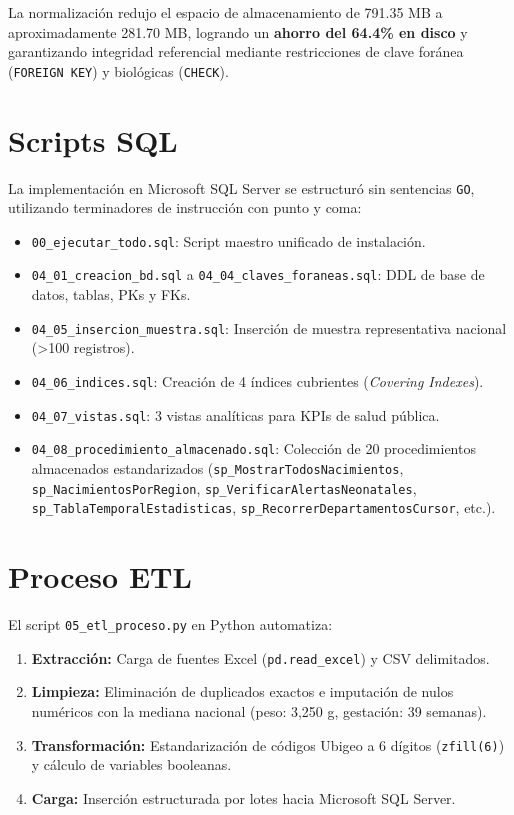 \documentclass[12pt,a4paper]{article}
\begin{document}
La normalización redujo el espacio de almacenamiento de 791.35 MB a aproximadamente 281.70 MB, logrando un \textbf{ahorro del 64.4\% en disco} y garantizando integridad referencial mediante restricciones de clave foránea (\texttt{FOREIGN KEY}) y biológicas (\texttt{CHECK}).

\section{Scripts SQL}

La implementación en Microsoft SQL Server se estructuró sin sentencias \texttt{GO}, utilizando terminadores de instrucción con punto y coma:
\begin{itemize}
    \item \texttt{00\_ejecutar\_todo.sql}: Script maestro unificado de instalación.
    \item \texttt{04\_01\_creacion\_bd.sql} a \texttt{04\_04\_claves\_foraneas.sql}: DDL de base de datos, tablas, PKs y FKs.
    \item \texttt{04\_05\_insercion\_muestra.sql}: Inserción de muestra representativa nacional (>100 registros).
    \item \texttt{04\_06\_indices.sql}: Creación de 4 índices cubrientes (\textit{Covering Indexes}).
    \item \texttt{04\_07\_vistas.sql}: 3 vistas analíticas para KPIs de salud pública.
    \item \texttt{04\_08\_procedimiento\_almacenado.sql}: Colección de 20 procedimientos almacenados estandarizados (\texttt{sp\_MostrarTodosNacimientos}, \texttt{sp\_NacimientosPorRegion}, \texttt{sp\_VerificarAlertasNeonatales}, \texttt{sp\_TablaTemporalEstadisticas}, \texttt{sp\_RecorrerDepartamentosCursor}, etc.).
\end{itemize}

\section{Proceso ETL}

El script \texttt{05\_etl\_proceso.py} en Python automatiza:
\begin{enumerate}
    \item \textbf{Extracción:} Carga de fuentes Excel (\texttt{pd.read\_excel}) y CSV delimitados.
    \item \textbf{Limpieza:} Eliminación de duplicados exactos e imputación de nulos numéricos con la mediana nacional (peso: 3,250 g, gestación: 39 semanas).
    \item \textbf{Transformación:} Estandarización de códigos Ubigeo a 6 dígitos (\texttt{zfill(6)}) y cálculo de variables booleanas.
    \item \textbf{Carga:} Inserción estructurada por lotes hacia Microsoft SQL Server.
\end{enumerate}
\end{document}
